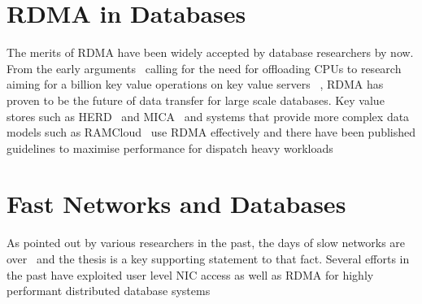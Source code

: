 \section{RDMA in Databases}
The merits of RDMA have been widely accepted by database researchers by now. From
the early arguments~\cite{rdmacase} calling for the need for offloading CPUs to 
research aiming for a billion key value operations on key value servers ~\cite{rdmabillion},
RDMA has proven to be the future of data transfer for large scale databases. Key value stores
such as HERD~\cite{herd} and MICA~\cite{mica} and systems that provide more complex
data models such as RAMCloud~\cite{ramcloud} use RDMA effectively and there have been 
published guidelines to maximise performance for dispatch heavy workloads~\cite{rdma}

\section{Fast Networks and Databases}
As pointed out by various researchers in the past, the days of slow networks are over~\cite{slow}
and the thesis is a key supporting statement to that fact. Several efforts in the past have exploited
user level NIC access as well as RDMA for highly performant distributed database systems~\cite{ramcloud,farm,farmtx,drtm,hyper}
